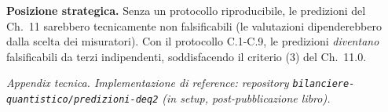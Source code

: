 \Hypoth{} \textbf{Posizione strategica.} Senza un protocollo
riproducibile, le predizioni del Ch.~11 sarebbero tecnicamente non
falsificabili (le valutazioni dipenderebbero dalla scelta dei
misuratori). Con il protocollo C.1-C.9, le predizioni \emph{diventano}
falsificabili da terzi indipendenti, soddisfacendo il criterio (3) del
Ch.~11.0.



\emph{Appendix tecnica. Implementazione di reference: repository
\texttt{bilanciere-quantistico/predizioni-deq2} (in setup,
post-pubblicazione libro).}
